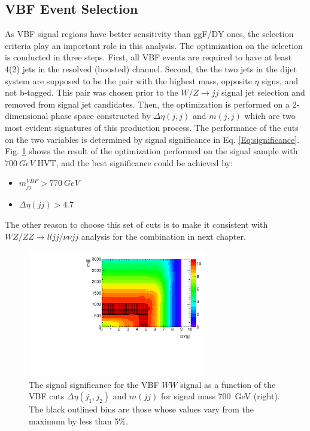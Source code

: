 \subsection{VBF Event Selection}
As VBF signal regions have better sensitivity than ggF/DY ones, the selection criteria play an important role in this analysis. The optimization on the selection is conducted in three steps. First, all VBF events are required to have at least 4(2) jets in the resolved (boosted) channel. Second, the the two jets in the dijet system are supposed to be the pair with the highest mass, opposite $\eta$ signs, and not b-tagged. This pair was chosen prior to the $W/Z\rightarrow jj$ signal jet selection and removed from signal jet candidates. Then, the optimization is performed on a 2-dimensional phase space constructed by $\Delta\eta(j,j)$ and $m(j,j)$ which are two most evident signatures of this production process. The performance of the cuts on the two variables is determined by signal significance in Eq. \ref{Eq:significance}. Fig. \ref{Fig:VBFOptimization} shows the result of the optimization performed on the signal sample with $700~GeV$ HVT, and the best significance could be achieved by:
\begin{itemize}
	\item {\bf $m_{jj}^{VBF}> 770~GeV$}
	\item {\bf $\Delta\eta(jj)>4.7$}
\end{itemize}
The other reason to choose this set of cuts is to make it consistent with $WZ/ZZ \rightarrow lljj/\nu\nu jj$ analysis\cite{EXOT-2016-29} for the combination in next chapter. 
\begin{figure}[h]
	\centering
	\includegraphics[width=0.7\textwidth]{Chapter3/VBF700_SignfSpace}
	\caption{The signal significance for the VBF $WW$ signal as a function of the VBF cuts $\Delta \eta(j_1,j_2)$ and $m(jj)$ for signal mass 700~GeV (right). The black outlined bins are those whose values vary from the maximum by less than 5\%.}
	\label{Fig:VBFOptimization}
\end{figure}

